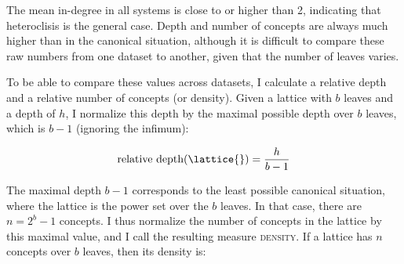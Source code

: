 \documentclass[output=paper]{langscibook}
\begin{document}
    \begin{table}
        \centering
        \caption{Canonicity measures of inflection class lattices based on alternation patterns}
        \label{tab:beniamine:CanonPats}
    \end{table}

    The mean in-degree in all systems is close to or higher than 2, indicating that heteroclisis is the general case. Depth and number of concepts are always much higher than in the canonical situation, although it is difficult to compare these raw numbers from one dataset to another, given that the number of leaves varies. 
    
    
    To be able to compare these values across datasets, I calculate a relative depth and a relative number of concepts (or density). Given a lattice with $b$ leaves and a depth of $h$, I normalize this depth by the maximal possible depth over $b$ leaves, which is $b-1$ (ignoring the infimum): 
    
    \begin{equation}
    \text{relative depth}(\lattice{}) = \frac{h}{b-1}
    \end{equation}
    
    The maximal depth $b-1$ corresponds to the least possible canonical situation, where the lattice is the power set over the $b$ leaves. In that case, there are $n=2^{b}-1$ concepts. I thus normalize the number of concepts in the lattice by this maximal value, and I call the resulting measure \textsc{density}. If a lattice \lattice{} has $n$ concepts over $b$ leaves, then its density is:
    
\end{document}
